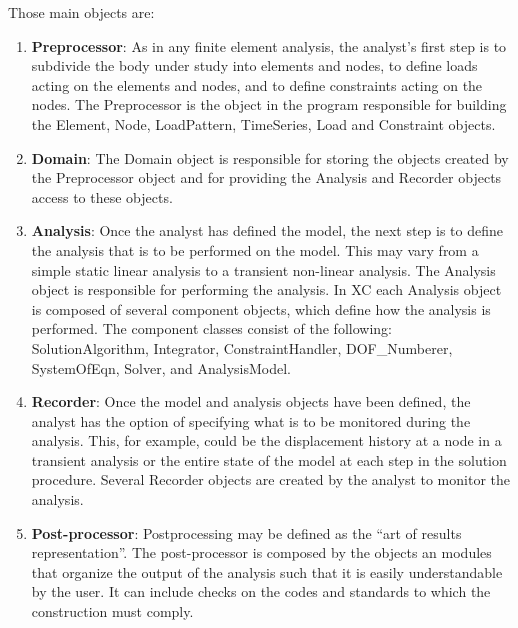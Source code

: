 Those main objects are:
\begin{enumerate}
\item {\bf Preprocessor}: As in any finite element analysis, the analyst's first step is to subdivide the body under study into elements and nodes, to define loads acting on the elements and nodes, and to define constraints acting on the nodes. The Preprocessor is the object in the program responsible for building the Element, Node, LoadPattern, TimeSeries, Load and Constraint objects.

\item {\bf Domain}: The Domain object is responsible for storing the objects created by the Preprocessor object and for providing the Analysis and Recorder objects access to these objects.

\item {\bf Analysis}: Once the analyst has defined the model, the next step is to define the analysis that is to be performed on the model. This may vary from a simple static linear analysis to a transient non-linear analysis. The Analysis object is responsible for performing the analysis. In XC each Analysis object is composed of several component objects, which define how the analysis is performed. The component classes consist of the following: { SolutionAlgorithm}, {Integrator}, { ConstraintHandler}, { DOF\_Numberer}, {SystemOfEqn}, {Solver}, and {AnalysisModel}. 

\item {\bf Recorder}: Once the model and analysis objects have been defined, the analyst has the option of specifying what is to be monitored during the analysis. This, for example, could be the displacement history at a node in a transient analysis or the entire state of the model at each step in the solution procedure. Several Recorder objects are created by the analyst to monitor the analysis.
  \item {\bf Post-processor}: Postprocessing may be defined as the “art of results representation”. The post-processor is composed by the objects an modules that organize the output of the analysis such that it is easily understandable by the user. It can include checks on the codes and standards to which the construction must comply.
\end{enumerate}





